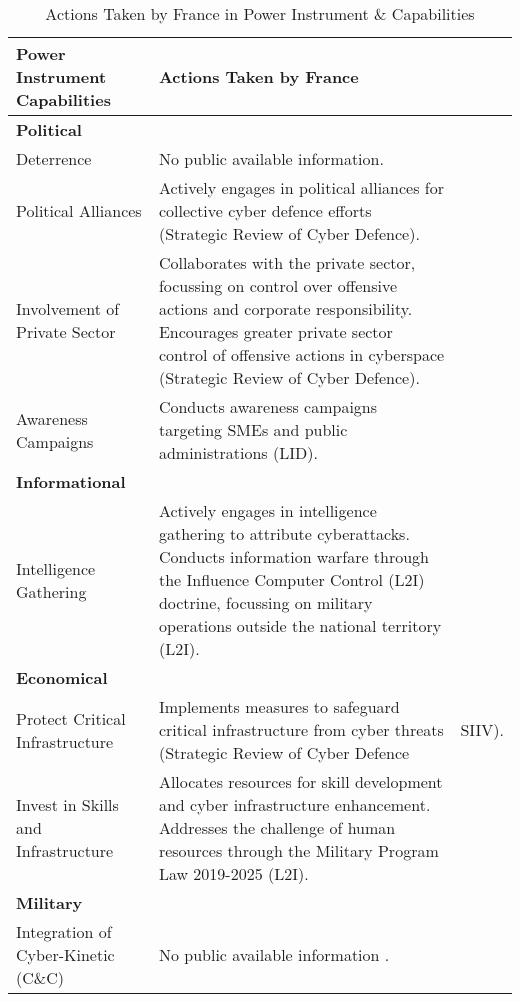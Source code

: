 \begin{table}[h]
\centering
\renewcommand{\arraystretch}{1.5} %
\caption{Actions Taken by France in Power Instrument \& Capabilities}
\begin{tabular}{>{\raggedright}p{4cm} p{11cm}}
\toprule
\textbf{Power Instrument Capabilities} & \textbf{Actions Taken by France} \\
\midrule
\textbf{Political} & \\
\hspace{0.2cm} Deterrence & No public available information. \\
\hspace{0.2cm} Political Alliances & Actively engages in political alliances for collective cyber defence efforts (Strategic Review of Cyber Defence). \\
\hspace{0.2cm} Involvement of Private Sector & Collaborates with the private sector, focussing on control over offensive actions and corporate responsibility. Encourages greater private sector control of offensive actions in cyberspace (Strategic Review of Cyber Defence). \\
\hspace{0.2cm} Awareness Campaigns & Conducts awareness campaigns targeting SMEs and public administrations (LID). \\
\midrule
\textbf{Informational} & \\
\hspace{0.2cm} Intelligence Gathering & Actively engages in intelligence gathering to attribute cyberattacks. Conducts information warfare through the Influence Computer Control (L2I) doctrine, focussing on military operations outside the national territory (L2I). \\
\midrule
\textbf{Economical} & \\
\hspace{0.2cm} Protect Critical Infrastructure & Implements measures to safeguard critical infrastructure from cyber threats (Strategic Review of Cyber Defence & SIIV). \\
\hspace{0.2cm} Invest in Skills and Infrastructure & Allocates resources for skill development and cyber infrastructure enhancement. Addresses the challenge of human resources through the Military Program Law 2019-2025 (L2I). \\
\midrule
\textbf{Military} & \\
\hspace{0.2cm} Integration of Cyber-Kinetic (C\&C) & No public available information . \\

\end{tabular}
\end{table}
